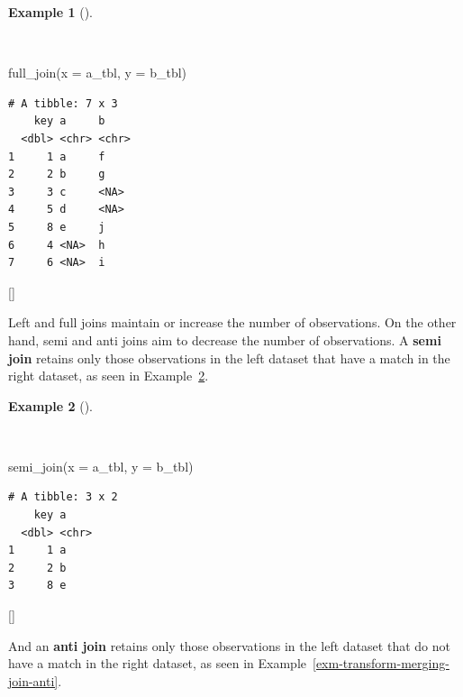 \documentclass[
  letterpaper,
  krantz1]{latex/krantz-mod}
\newenvironment{Shaded}{\begin{snugshade}}{\end{snugshade}}
\newcommand{\AttributeTok}[1]{\textcolor[rgb]{0.00,0.00,0.00}{#1}}
\newcommand{\FunctionTok}[1]{\textcolor[rgb]{0.00,0.00,0.00}{#1}}
\newcommand{\NormalTok}[1]{\textcolor[rgb]{0.00,0.00,0.00}{#1}}
\newcommand{\cindex}[1]{%
  \StrSubstitute{#1}{_}{\_}[\temp]%
  \index{\temp}%
}
\theoremstyle{definition}
\theoremstyle{definition}
\newtheorem{example}{Example}[chapter]
\theoremstyle{remark}
\begin{document}
\begin{example}[]\protect\hypertarget{exm-transform-merging-join-full}{}\label{exm-transform-merging-join-full}

~

\begin{Shaded}
\begin{Highlighting}[numbers=left,,]
\FunctionTok{full\_join}\NormalTok{(}\AttributeTok{x =}\NormalTok{ a\_tbl, }\AttributeTok{y =}\NormalTok{ b\_tbl)}
\end{Highlighting}
\end{Shaded}

\begin{verbatim}
# A tibble: 7 x 3
    key a     b    
  <dbl> <chr> <chr>
1     1 a     f    
2     2 b     g    
3     3 c     <NA> 
4     5 d     <NA> 
5     8 e     j    
6     4 <NA>  h    
7     6 <NA>  i    
\end{verbatim}

\cindex{full_join()}

\end{example}

Left and full joins maintain or increase the number of observations. On
the other hand, semi and anti joins aim to decrease the number of
observations. A \textbf{semi join}
retains only those observations in the left dataset that have a match in
the right dataset, as seen in
Example~\ref{exm-transform-merging-join-semi}.

\begin{example}[]\protect\hypertarget{exm-transform-merging-join-semi}{}\label{exm-transform-merging-join-semi}

~

\begin{Shaded}
\begin{Highlighting}[numbers=left,,]
\FunctionTok{semi\_join}\NormalTok{(}\AttributeTok{x =}\NormalTok{ a\_tbl, }\AttributeTok{y =}\NormalTok{ b\_tbl)}
\end{Highlighting}
\end{Shaded}

\begin{verbatim}
# A tibble: 3 x 2
    key a    
  <dbl> <chr>
1     1 a    
2     2 b    
3     8 e    
\end{verbatim}

\cindex{semi_join()}

\end{example}

And an \textbf{anti join} retains only
those observations in the left dataset that do not have a match in the
right dataset, as seen in Example~\ref{exm-transform-merging-join-anti}.
\end{document}
